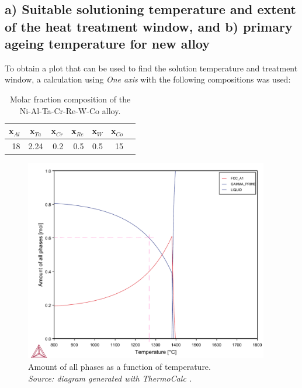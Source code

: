 \section{}

\subsection{a) Suitable solutioning temperature and extent of the heat treatment window, and b) primary ageing temperature for new alloy}

To obtain a plot that can be used to find the solution temperature and treatment window, a calculation using \textit{One axis} with the following compositions was used:

\begin{table}[h]
  \centering
  \begin{tabular}{rrrrrrr}
    \multicolumn{1}{c}{x$_{Al}$} & \multicolumn{1}{c}{x$_{Ta}$} & \multicolumn{1}{c}{x$_{Cr}$} & \multicolumn{1}{c}{x$_{Re}$} & \multicolumn{1}{c}{x$_{W}$} & \multicolumn{1}{c}{x$_{Co}$} \\ \hline \hline
    18 & 2.24 & 0.2 & 0.5 & 0.5 & 15
  \end{tabular}
  \caption{Molar fraction composition of the Ni-Al-Ta-Cr-Re-W-Co alloy.}
  \label{tab:tab06}
\end{table}

\begin{figure}[h]
  \centering
    \includegraphics[width=0.95\textwidth]{graficas/Q4_02_1.png}
    \caption{\centering Amount of all phases as a function of temperature. \\
    \textit{Source: diagram generated with ThermoCalc \citep{thermocalc}.}}
    \label{fig:diagram05}
\end{figure}

